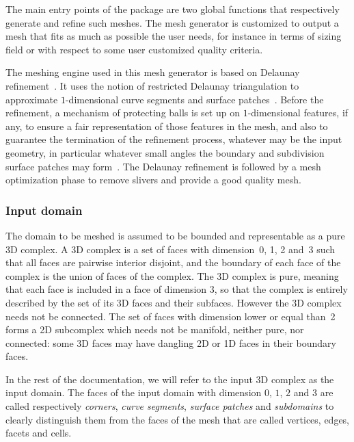  The main entry points of the package are
two global  functions that respectively generate
and refine such meshes.
The mesh generator is customized to output a mesh
that fits as much as possible the user needs,
for instance in terms of  sizing field 
or with respect to some user customized quality criteria.


The  meshing engine used in this mesh generator
is  based on  Delaunay refinement~\cite{c-gqmgc-93, r-draq2d-95, s-tmgdr-98}.
It uses the notion of restricted Delaunay triangulation
 to approximate $1$-dimensional curve segments and   surface patches~\cite{cgal:bo-pgsms-05}.
Before the refinement, a mechanism of protecting balls is set up on $1$-dimensional features, if any,
 to ensure a fair representation
of those features in the mesh, and also to guarantee the termination of the refinement process,
whatever may be the input geometry, in particular whatever small angles
the boundary and subdivision surface patches may form~\cite{cgal:cdl-pdma-07,cgal:cdr-drpsc-07}.
The Delaunay refinement is followed by a mesh  optimization phase
to remove slivers and provide a good quality mesh.
 




\subsubsection{Input domain}

The  domain to be meshed is assumed to be bounded
 and  representable as a pure
3D complex. A 3D complex is a set of faces with dimension~0,
1, 2  and~3  such that
all faces are pairwise interior disjoint, 
and the boundary of each face of the complex is the union of faces
of the complex.
The 3D complex is pure, meaning that each face is included in a face of dimension 3,
so that the complex is entirely described by the set of its 3D faces and their subfaces.
However the 3D complex needs not be connected.
The set of faces with dimension lower or equal than~2 forms a 2D
subcomplex which needs not be manifold, neither pure, nor connected:
some 3D faces may have dangling 2D or 1D faces in their boundary faces.

In the rest of the documentation, we will refer to the
input 3D complex as  the input domain. The faces of the input domain 
with dimension $0$, $1$, $2$ and $3$ are called respectively
{\em corners},  {\em curve segments}, {\em surface patches} and {\em subdomains}
to clearly distinguish them from the faces of the mesh
that are called vertices, edges, facets and cells.

